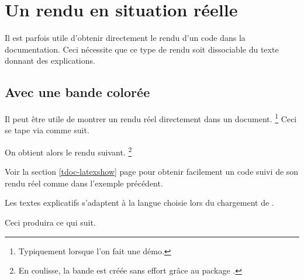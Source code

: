 \section{Un rendu en situation réelle} \label{tdoc-showcase}

Il est parfois utile d'obtenir directement le rendu d'un code dans la documentation. Ceci nécessite que ce type de rendu soit dissociable du texte donnant des explications.




\subsection{Avec une bande colorée}

\begin{tdocexa}
    Il peut être utile de montrer un rendu réel directement dans un document.
    \footnote{
        Typiquement lorsque l'on fait une démo.
    }
    Ceci se tape via  comme suit.


    On obtient alors le rendu suivant.
    \footnote{
        En coulisse, la bande est créée sans effort grâce au package .
    }

    \medskip

    
\end{tdocexa}


\begin{tdocrem}
    Voir la section \ref{tdoc-latexshow} page \pageref{tdoc-latexshow} pour obtenir facilement un code suivi de son rendu réel comme dans l'exemple précédent.
\end{tdocrem}


\begin{tdocnote}
    Les textes explicatifs s'adaptent à la langue choisie lors du chargement de .
\end{tdocnote}




\begin{tdocexa}
    \leavevmode


    Ceci produira ce qui suit.

    \medskip

    
\end{tdocexa}


